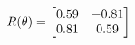 \documentclass[preview]{standalone}
\begin{document}
\begin{align*}
\special{dvisvgm:raw <g id='unique000'>}R(\theta) = \begin{bmatrix}0.59 & -0.81\\0.81 & 0.59\end{bmatrix}\special{dvisvgm:raw </g>}
\end{align*}
\end{document}
